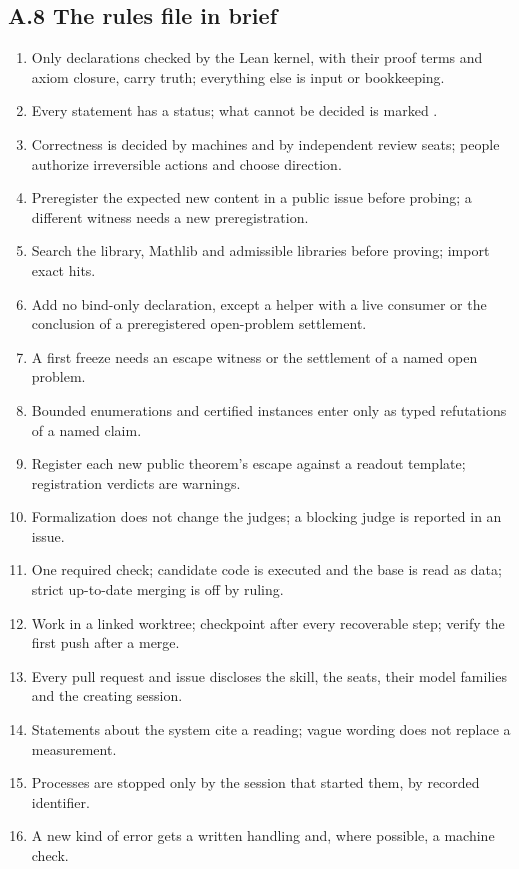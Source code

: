 \documentclass[11pt]{article}
\newcommand{\code}[1]{\texttt{\detokenize{#1}}}
\begin{document}
\subsection*{A.8 The rules file in brief}
\begin{enumerate}[leftmargin=*,itemsep=0pt]\small
\item Only declarations checked by the Lean kernel, with their proof terms and axiom closure, carry truth; everything else is input or bookkeeping.
\item Every statement has a status; what cannot be decided is marked \code{open}.
\item Correctness is decided by machines and by independent review seats; people authorize irreversible actions and choose direction.
\item Preregister the expected new content in a public issue before probing; a different witness needs a new preregistration.
\item Search the library, Mathlib and admissible libraries before proving; import exact hits.
\item Add no bind-only declaration, except a helper with a live consumer or the conclusion of a preregistered open-problem settlement.
\item A first freeze needs an escape witness or the settlement of a named open problem.
\item Bounded enumerations and certified instances enter only as typed refutations of a named claim.
\item Register each new public theorem's escape against a readout template; registration verdicts are warnings.
\item Formalization does not change the judges; a blocking judge is reported in an issue.
\item One required check; candidate code is executed and the base is read as data; strict up-to-date merging is off by ruling.
\item Work in a linked worktree; checkpoint after every recoverable step; verify the first push after a merge.
\item Every pull request and issue discloses the skill, the seats, their model families and the creating session.
\item Statements about the system cite a reading; vague wording does not replace a measurement.
\item Processes are stopped only by the session that started them, by recorded identifier.
\item A new kind of error gets a written handling and, where possible, a machine check.
\end{enumerate}
\end{document}
